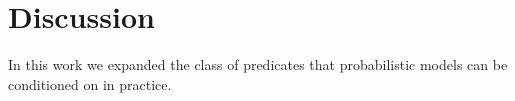 \section{Discussion}
In this work we expanded the class of predicates that probabilistic models can be conditioned on in practice.





